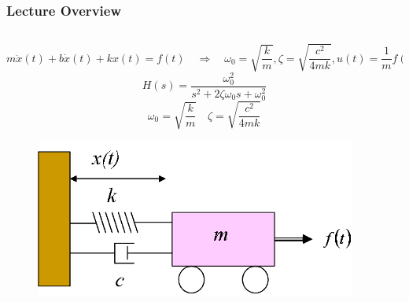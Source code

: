 \documentclass[aspectratio=169,handout]{beamer}
\begin{document}
\begin{frame}
	\frametitle{Lecture Overview}
	\begin{columns}
		\begin{column}{0.25\textwidth}
			\[
				m \ddot{x}(t) + b \dot{x}(t) + k x(t) = f(t)
				\quad \Rightarrow \quad
				\omega_0 = \sqrt{\frac{k}{m}}
				,
				\zeta = \sqrt{\frac{c^2}{4 m k}}
				,
				u(t) = \frac{1}{m} f(t)	
			\]
			\[
				H(s)
				= \frac{
					\omega_0^2
				}{
					s^2 + 2 \zeta \omega_0 s + \omega_0^2
				}
			\]
			\[
				\omega_0 = \sqrt{\frac{k}{m}}
				\quad
				\zeta = \sqrt{\frac{c^2}{4 m k}}
			\]
			\begin{figure}[]
				\includegraphics[width=\textwidth]{Images/SpringMassDamper_cartSystem.png}
			\end{figure}
		\end{column}
	\end{columns}
\end{frame}

% 	
% 	
\end{document}
